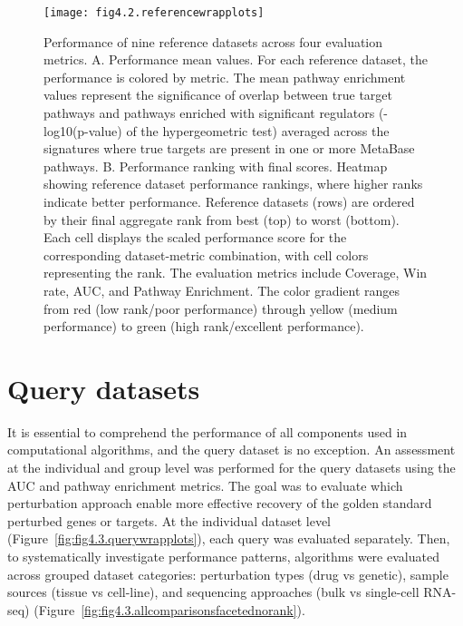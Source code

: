 \begin{figure}[htbp]
    \centering
    \texttt{[image: fig4.2.referencewrapplots]}
    \caption[Performance of nine reference datasets across four evaluation metrics.]{Performance of nine reference datasets across four evaluation metrics. A. Performance mean values. For each reference dataset, the performance is colored by metric. The mean pathway enrichment values represent the significance of overlap between true target pathways and pathways enriched with significant regulators (-log10(p-value) of the hypergeometric test) averaged across the signatures where true targets are present in one or more MetaBase pathways. B. Performance ranking with final scores. Heatmap showing reference dataset performance rankings, where higher ranks indicate better performance. Reference datasets (rows) are ordered by their final aggregate rank from best (top) to worst (bottom). Each cell displays the scaled performance score for the corresponding dataset-metric combination, with cell colors representing the rank. The evaluation metrics include Coverage, Win rate, \gls{AUC}, and Pathway Enrichment. The color gradient ranges from red (low rank/poor performance) through yellow (medium performance) to green (high rank/excellent performance).}
    \label{fig:fig4.2.referencewrapplots}
\end{figure}



\section{Query datasets} %
\label{sec:querydatasetsresults}

It is essential to comprehend the performance of all components used in computational algorithms, and the query dataset is no exception. An assessment at the individual and group level was performed for the query datasets using the \gls{AUC} and pathway enrichment metrics. The goal was to evaluate which perturbation approach enable more effective recovery of the golden standard perturbed genes or targets. At the individual dataset level (Figure~\ref{fig:fig4.3.querywrapplots}), each query was evaluated separately. Then, to systematically investigate performance patterns, algorithms were evaluated across grouped dataset categories: perturbation types (drug vs genetic), sample sources (tissue vs cell-line), and sequencing approaches (bulk vs single-cell RNA-seq) (Figure~\ref{fig:fig4.3.allcomparisonsfacetednorank}).

